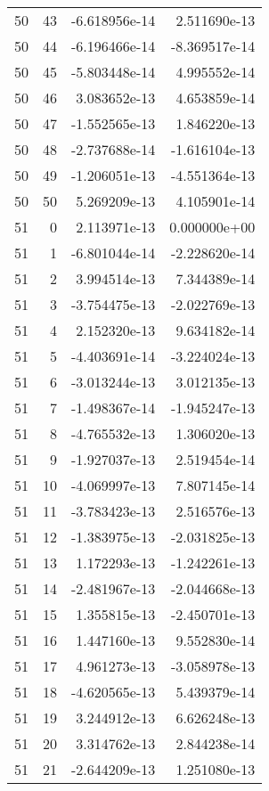 \begin{tabular}{rrrr}
  50 &   43 & -6.618956e-14 &  2.511690e-13 \\
  50 &   44 & -6.196466e-14 & -8.369517e-14 \\
  50 &   45 & -5.803448e-14 &  4.995552e-14 \\
  50 &   46 &  3.083652e-13 &  4.653859e-14 \\
  50 &   47 & -1.552565e-13 &  1.846220e-13 \\
  50 &   48 & -2.737688e-14 & -1.616104e-13 \\
  50 &   49 & -1.206051e-13 & -4.551364e-13 \\
  50 &   50 &  5.269209e-13 &  4.105901e-14 \\
  51 &    0 &  2.113971e-13 &  0.000000e+00 \\
  51 &    1 & -6.801044e-14 & -2.228620e-14 \\
  51 &    2 &  3.994514e-13 &  7.344389e-14 \\
  51 &    3 & -3.754475e-13 & -2.022769e-13 \\
  51 &    4 &  2.152320e-13 &  9.634182e-14 \\
  51 &    5 & -4.403691e-14 & -3.224024e-13 \\
  51 &    6 & -3.013244e-13 &  3.012135e-13 \\
  51 &    7 & -1.498367e-14 & -1.945247e-13 \\
  51 &    8 & -4.765532e-13 &  1.306020e-13 \\
  51 &    9 & -1.927037e-13 &  2.519454e-14 \\
  51 &   10 & -4.069997e-13 &  7.807145e-14 \\
  51 &   11 & -3.783423e-13 &  2.516576e-13 \\
  51 &   12 & -1.383975e-13 & -2.031825e-13 \\
  51 &   13 &  1.172293e-13 & -1.242261e-13 \\
  51 &   14 & -2.481967e-13 & -2.044668e-13 \\
  51 &   15 &  1.355815e-13 & -2.450701e-13 \\
  51 &   16 &  1.447160e-13 &  9.552830e-14 \\
  51 &   17 &  4.961273e-13 & -3.058978e-13 \\
  51 &   18 & -4.620565e-13 &  5.439379e-14 \\
  51 &   19 &  3.244912e-13 &  6.626248e-13 \\
  51 &   20 &  3.314762e-13 &  2.844238e-14 \\
  51 &   21 & -2.644209e-13 &  1.251080e-13 \\

\end{tabular}
